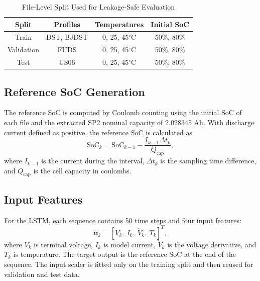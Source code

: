 \documentclass[lettersize,journal]{IEEEtran}
\begin{document}
\begin{table}[!t]
\caption{File-Level Split Used for Leakage-Safe Evaluation}
\label{tab:split}
\centering
\begin{tabular}{|c|c|c|c|}
\hline
\textbf{Split} & \textbf{Profiles} & \textbf{Temperatures} & \textbf{Initial SoC} \\
\hline
Train & DST, BJDST & 0, 25, 45$^\circ$C & 50\%, 80\% \\
\hline
Validation & FUDS & 0, 25, 45$^\circ$C & 50\%, 80\% \\
\hline
Test & US06 & 0, 25, 45$^\circ$C & 50\%, 80\% \\
\hline
\end{tabular}
\end{table}

\subsection{Reference SoC Generation}
The reference SoC is computed by Coulomb counting using the initial SoC of each file and the extracted SP2 nominal capacity of 2.028345 Ah. With discharge current defined as positive, the reference SoC is calculated as
\begin{equation}
    \mathrm{SoC}_{k} = \mathrm{SoC}_{k-1} - \frac{I_{k-1}\Delta t_k}{Q_{\mathrm{cap}}},
    \label{eq:soc_cc}
\end{equation}
where $I_{k-1}$ is the current during the interval, $\Delta t_k$ is the sampling time difference, and $Q_{\mathrm{cap}}$ is the cell capacity in coulombs.

\subsection{Input Features}
For the LSTM, each sequence contains 50 time steps and four input features:
\begin{equation}
    \mathbf{u}_k = [V_k,\ I_k,\ \dot{V}_k,\ T_k]^T,
\end{equation}
where $V_k$ is terminal voltage, $I_k$ is model current, $\dot{V}_k$ is the voltage derivative, and $T_k$ is temperature. The target output is the reference SoC at the end of the sequence. The input scaler is fitted only on the training split and then reused for validation and test data.
\end{document}
